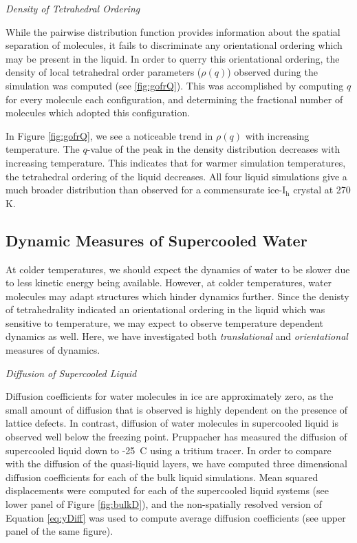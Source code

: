 \begin{flushleft}
\textit{Density of Tetrahedral Ordering}
\end{flushleft}

While the pairwise distribution function provides information about
the spatial separation of molecules, it fails to discriminate any
orientational ordering which may be present in the liquid. In order to
querry this orientational ordering, the density of local tetrahedral
order parameters ($\rho (q)$) observed during the simulation was
computed (see \ref{fig:gofrQ}). This was accomplished by computing $q$
for every molecule each configuration, and determining the fractional
number of molecules which adopted this configuration.

In Figure \ref{fig:gofrQ}, we see a noticeable trend in $\rho (q)$
with increasing temperature. The $q$-value of the peak in the density
distribution decreases with increasing temperature. This indicates
that for warmer simulation temperatures, the tetrahedral ordering of
the liquid decreases. All four liquid simulations give a much broader
distribution than observed for a commensurate ice-I$_\mathrm{h}$
crystal at 270 K.





\subsection{Dynamic Measures of Supercooled Water}
At colder temperatures, we should expect the dynamics of water to be
slower due to less kinetic energy being available. However, at colder
temperatures, water molecules may adapt structures which hinder
dynamics further. Since the denisty of tetrahedrality indicated an
orientational ordering in the liquid which was sensitive to
temperature, we may expect to observe temperature dependent dynamics
as well. Here, we have investigated both \textit{translational} and
\textit{orientational} measures of dynamics.

\begin{flushleft}
\textit{Diffusion of Supercooled Liquid}
\end{flushleft}

Diffusion coefficients for water molecules in ice are approximately
zero, as the small amount of diffusion that is observed is highly
dependent on the presence of lattice defects. In contrast, diffusion
of water molecules in supercooled liquid is observed well below the
freezing point.\cite{Debenedetti2003} Pruppacher has measured the
diffusion of supercooled liquid down to -25\degree~C using a tritium
tracer.\cite{Pruppacher1972} In order to compare with the diffusion of
the quasi-liquid layers, we have computed three dimensional diffusion
coefficients for each of the bulk liquid simulations. Mean squared
displacements were computed for each of the supercooled liquid systems
(see lower panel of Figure \ref{fig:bulkD}), and the non-spatially
resolved version of Equation \eqref{eq:yDiff} was used to compute
average diffusion coefficients (see upper panel of the same figure).

